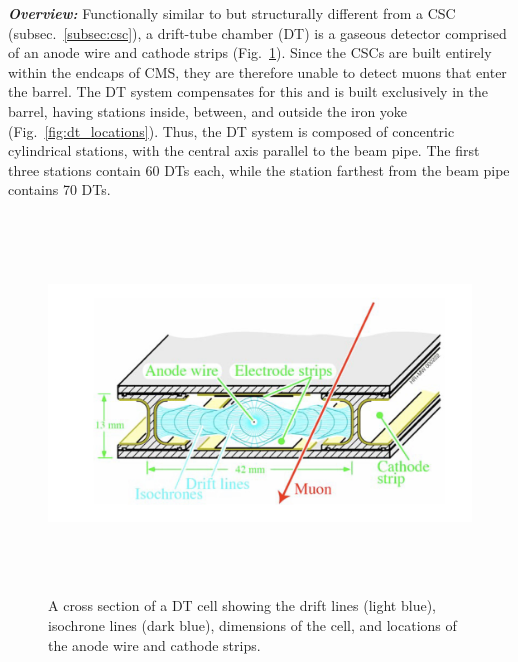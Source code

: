 \textbf{\textit{Overview:}}
Functionally similar to but structurally different from a CSC (subsec.~\ref{subsec:csc}), a drift-tube chamber (DT) is a gaseous detector comprised of an anode wire and cathode strips (Fig.~\ref{fig:dt_xs}).
Since the CSCs are built entirely within the endcaps of CMS, they are therefore unable to detect muons that enter the barrel.
The DT system compensates for this and is built exclusively in the barrel, having stations inside, between, and outside the iron yoke (Fig.~\ref{fig:dt_locations}).
Thus, the DT system is composed of concentric cylindrical stations, with the central axis parallel to the beam pipe.
The first three stations contain 60 DTs each, while the station farthest from the beam pipe contains 70 DTs.
\begin{figure}[pbth]
    \centering
    \includegraphics[width=15cm,height=10cm,keepaspectratio]{figures/cms/muonsys/drifttube_xs.jpeg}
    \caption{
        A cross section of a DT cell showing the drift lines (light blue), isochrone lines (dark blue), dimensions of the cell, and locations of the anode wire and cathode strips.
        }
        \label{fig:dt_xs}
\end{figure}
